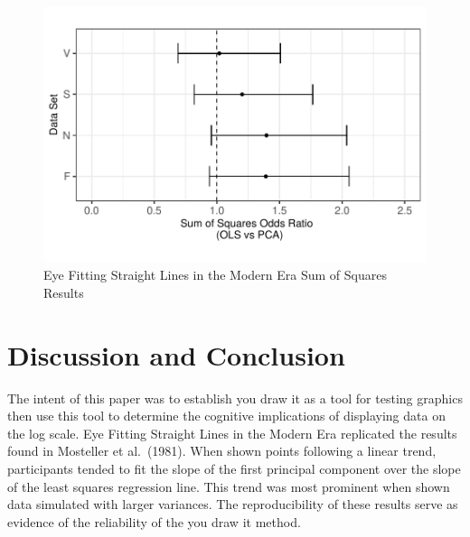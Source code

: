\documentclass[12pt]{article}
\begin{document}
\begin{figure}[tbp]

{\centering \includegraphics[width=0.75\linewidth,]{Eye-Fitting-Stright-Lines-in-the-Modern-Era_files/figure-latex/eyefitting-ss-oddsratio-1} 

}

\caption{Eye Fitting Straight Lines in the Modern Era Sum of Squares Results}\label{fig:eyefitting-ss-oddsratio}
\end{figure}

\hypertarget{discussion-and-conclusion}{%
\section{Discussion and Conclusion}\label{discussion-and-conclusion}}

The intent of this paper was to establish you draw it as a tool for
testing graphics then use this tool to determine the cognitive
implications of displaying data on the log scale. Eye Fitting Straight
Lines in the Modern Era replicated the results found in Mosteller et
al.~(1981). When shown points following a linear trend, participants
tended to fit the slope of the first principal component over the slope
of the least squares regression line. This trend was most prominent when
shown data simulated with larger variances. The reproducibility of these
results serve as evidence of the reliability of the you draw it method.



\end{document}
